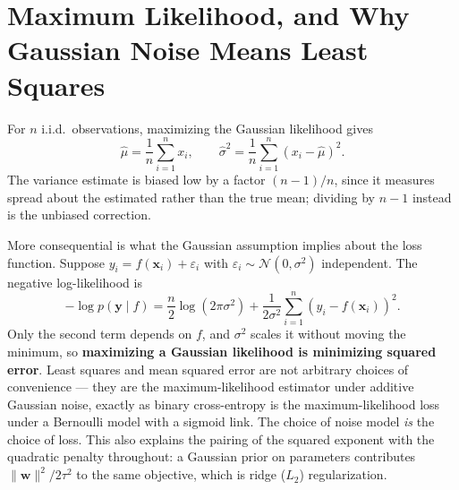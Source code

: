 \documentclass[conference]{IEEEtran}
\begin{document}
\section*{Maximum Likelihood, and Why Gaussian Noise Means Least Squares}
For $n$ i.i.d.\ observations, maximizing the Gaussian likelihood gives
\begin{equation}
    \hat{\mu} = \frac{1}{n}\sum_{i=1}^{n}x_i,
    \qquad
    \hat{\sigma}^2 = \frac{1}{n}\sum_{i=1}^{n}(x_i - \hat{\mu})^2.
\end{equation}
The variance estimate is biased low by a factor $(n-1)/n$, since it measures spread about the estimated rather than the true mean; dividing by $n-1$ instead is the unbiased correction.

More consequential is what the Gaussian assumption implies about the loss function. Suppose $y_i = f(\mathbf{x}_i) + \varepsilon_i$ with $\varepsilon_i \sim \mathcal{N}(0,\sigma^2)$ independent. The negative log-likelihood is
\begin{equation}
    -\log p(\mathbf{y} \mid f) = \frac{n}{2}\log(2\pi\sigma^2) + \frac{1}{2\sigma^2}\sum_{i=1}^{n}\left(y_i - f(\mathbf{x}_i)\right)^2.
\end{equation}
Only the second term depends on $f$, and $\sigma^2$ scales it without moving the minimum, so \textbf{maximizing a Gaussian likelihood is minimizing squared error}. Least squares and mean squared error are not arbitrary choices of convenience --- they are the maximum-likelihood estimator under additive Gaussian noise, exactly as binary cross-entropy is the maximum-likelihood loss under a Bernoulli model with a sigmoid link. The choice of noise model \textit{is} the choice of loss. This also explains the pairing of the squared exponent with the quadratic penalty throughout: a Gaussian prior on parameters contributes $\|\mathbf{w}\|^2/2\tau^2$ to the same objective, which is ridge ($L_2$) regularization.
\end{document}
